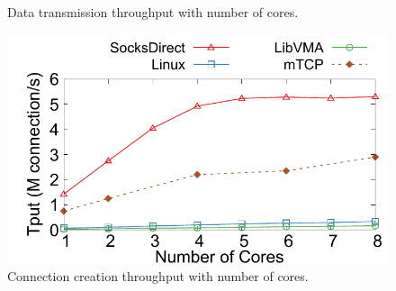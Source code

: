 \begin{figure}[t!]
\begin{minipage}{.32\textwidth}
		\caption{Data transmission throughput with number of cores.}
		\label{fig:eval-corenum-tput}
	\end{minipage}
	\begin{minipage}{.32\textwidth}
		\centering
		\includegraphics[width=\textwidth]{eval/microbenchmark/conn-setup-tput.pdf}
		\vspace{-10pt}
		\caption{Connection creation throughput with number of cores.}
		\label{fig:eval-conn-setup-tput}
		

\end{minipage}
\end{figure}
